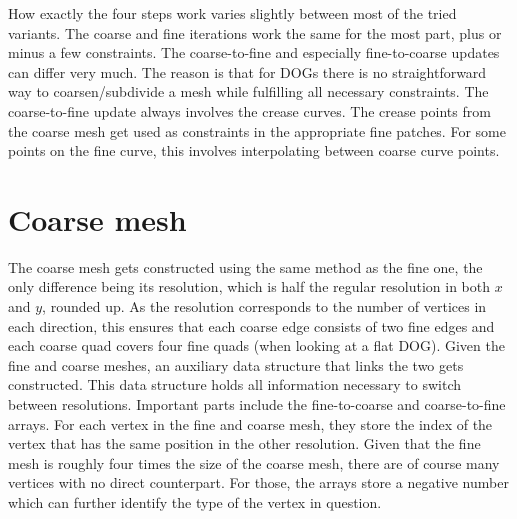 \documentclass[a4paper,twoside,12pt,nochapterprefix]{scrbook}
\begin{document}
How exactly the four steps work varies slightly between most of the tried variants. The coarse and fine iterations work the same for the most part, plus or minus a few constraints. The coarse-to-fine and especially fine-to-coarse updates can differ very much. The reason is that for DOGs there is no straightforward way to coarsen/subdivide a mesh while fulfilling all necessary constraints.\newline
The coarse-to-fine update always involves the crease curves. The crease points from the coarse mesh get used as constraints in the appropriate fine patches. For some points on the fine curve, this involves interpolating between coarse curve points.
\section{Coarse mesh}\label{sec:coarse_construction}
The coarse mesh gets constructed using the same method as the fine one, the only difference being its resolution, which is half the regular resolution in both $x$ and $y$, rounded up. As the resolution corresponds to the number of vertices in each direction, this ensures that each coarse edge consists of two fine edges and each coarse quad covers four fine quads (when looking at a flat DOG).\newline
Given the fine and coarse meshes, an auxiliary data structure that links the two gets constructed. This data structure holds all information necessary to switch between resolutions. Important parts include the fine-to-coarse and coarse-to-fine arrays. For each vertex in the fine and coarse mesh, they store the index of the vertex that has the same position in the other resolution. Given that the fine mesh is roughly four times the size of the coarse mesh, there are of course many vertices with no direct counterpart. For those, the arrays store a negative number which can further identify the type of the vertex in question.\newline
\end{document}
